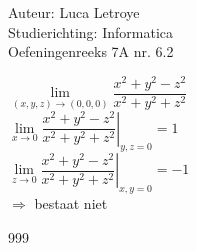\documentclass[a4paper]{article}
\begin{document}
  
\noindent \large Auteur: Luca Letroye \\
\noindent \large Studierichting: Informatica\\
\noindent \large Oefeningenreeks 7A nr. 6.2\\

\medskip
\normalsize

$\lim\limits_{(x,y,z)\rightarrow(0,0,0)} \dfrac{x^2+y^2-z^2}{x^2+y^2+z^2}$\\

$\left. \lim\limits_{x\rightarrow0} \dfrac{x^2+y^2-z^2}{x^2+y^2+z^2}\right|_{y,z=0} = 1$\\

$\left. \lim\limits_{z\rightarrow0} \dfrac{x^2+y^2-z^2}{x^2+y^2+z^2}\right|_{x,y=0} = -1$\\

$\Rightarrow $ bestaat niet \\






\begin{thebibliography}{999}
\end{thebibliography}
\end{document}
